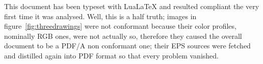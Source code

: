 This document has been typeset with LuaLaTeX and resulted compliant the very first time it was analysed. Well, this is a half truth; images in figure~\ref{fig:threedrawings} were not conformant because their color profiles, nominally RGB ones, were not actually so, therefore they caused the overall document to be a PDF/A non conformant one; their EPS sources were fetched and distilled again into PDF format so that every problem vanished.







